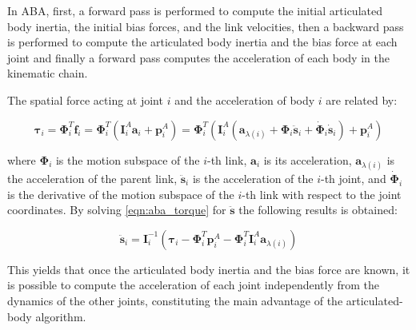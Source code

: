 In ABA, first, a forward pass is performed to compute the initial articulated body inertia, the initial bias forces, and the link velocities, then a backward pass is performed to compute the articulated body inertia and the bias force at each joint and finally a forward pass computes the acceleration of each body in the kinematic chain.  

The spatial force acting at joint $i$ and the acceleration of body $i$ are related by:

\begin{equation}
    \label{eqn:aba_torque}
    \boldsymbol{\tau} _i = \boldsymbol{\Phi} ^T _i \mathbf{f} _i = \boldsymbol{\Phi} ^T _i (\mathbf{I} _i ^A \mathbf{a} _i + \mathbf{p} ^A _i) = \boldsymbol{\Phi} ^T _i (\mathbf{I} _i ^A (\mathbf{a} _{\lambda(i)} + \boldsymbol{\Phi} _i \ddot{\mathbf{s}} _i + \dot{\boldsymbol{\Phi}} _i \dot{\mathbf{s}} _i)+ \mathbf{p} ^A _i)
\end{equation}

where $\boldsymbol{\Phi} _i$ is the motion subspace of the $i$-th link, $\mathbf{a} _i$ is its acceleration, $\mathbf{a} _{\lambda(i)}$ is the acceleration of the parent link, $\ddot{\mathbf{s}} _i$ is the acceleration of the $i$-th joint, and $\dot{\boldsymbol{\Phi}} _i$ is the derivative of the motion subspace of the $i$-th link with respect to the joint coordinates.
By solving \cref{eqn:aba_torque} for $\ddot{\mathbf{s}}$ the following results is obtained:

\begin{equation}
    \ddot{\mathbf{s}} _i = \mathbf{I} _i ^{-1} (\boldsymbol{\tau} _i - \boldsymbol{\Phi} ^T _i \mathbf{p} ^A _i - \boldsymbol{\Phi} ^T _i \mathbf{I} _i ^A \mathbf{a} _{\lambda(i)})
\end{equation}

This yields that once the articulated body inertia and the bias force are known, it is possible to compute the acceleration of each joint independently from the dynamics of the other joints, constituting the main advantage of the articulated-body algorithm. 


